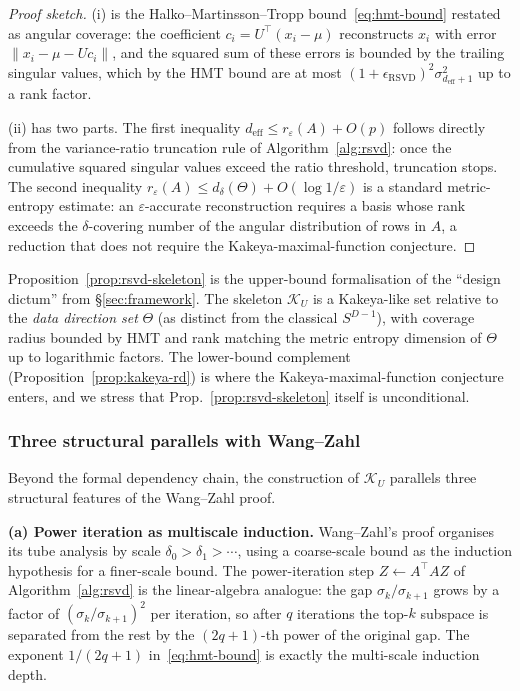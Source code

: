 \documentclass[11pt,a4paper]{article}
\theoremstyle{definition}
\theoremstyle{plain}
\newcommand{\norm}[1]{\left\lVert#1\right\rVert}
\begin{document}
\begin{proof}[Proof sketch]
(i) is the Halko--Martinsson--Tropp bound~\eqref{eq:hmt-bound} restated as angular coverage: the coefficient $c_i = U^\top(x_i - \mu)$ reconstructs $x_i$ with error $\norm{x_i - \mu - U c_i}$, and the squared sum of these errors is bounded by the trailing singular values, which by the HMT bound are at most $(1 + \epsilon_{\text{RSVD}})^2 \sigma_{d_{\text{eff}}+1}^2$ up to a rank factor.

(ii) has two parts. The first inequality $d_{\text{eff}} \leq r_\varepsilon(A) + O(p)$ follows directly from the variance-ratio truncation rule of Algorithm~\ref{alg:rsvd}: once the cumulative squared singular values exceed the ratio threshold, truncation stops. The second inequality $r_\varepsilon(A) \leq d_\delta(\Theta) + O(\log 1/\varepsilon)$ is a standard metric-entropy estimate: an $\varepsilon$-accurate reconstruction requires a basis whose rank exceeds the $\delta$-covering number of the angular distribution of rows in $A$, a reduction that does not require the Kakeya-maximal-function conjecture.
\end{proof}

Proposition~\ref{prop:rsvd-skeleton} is the upper-bound formalisation of the ``design dictum'' from \S\ref{sec:framework}. The skeleton $\mathcal{K}_U$ is a Kakeya-like set relative to the \emph{data direction set} $\Theta$ (as distinct from the classical $S^{D-1}$), with coverage radius bounded by HMT and rank matching the metric entropy dimension of $\Theta$ up to logarithmic factors. The lower-bound complement (Proposition~\ref{prop:kakeya-rd}) is where the Kakeya-maximal-function conjecture enters, and we stress that Prop.~\ref{prop:rsvd-skeleton} itself is unconditional.

\subsubsection*{Three structural parallels with Wang--Zahl}

Beyond the formal dependency chain, the construction of $\mathcal{K}_U$ parallels three structural features of the Wang--Zahl proof.

\textbf{(a) Power iteration as multiscale induction.}
Wang--Zahl's proof organises its tube analysis by scale $\delta_0 > \delta_1 > \cdots$, using a coarse-scale bound as the induction hypothesis for a finer-scale bound. The power-iteration step $Z \leftarrow A^\top A Z$ of Algorithm~\ref{alg:rsvd} is the linear-algebra analogue: the gap $\sigma_k / \sigma_{k+1}$ grows by a factor of $(\sigma_k/\sigma_{k+1})^2$ per iteration, so after $q$ iterations the top-$k$ subspace is separated from the rest by the $(2q+1)$-th power of the original gap. The exponent $1/(2q+1)$ in~\eqref{eq:hmt-bound} is exactly the multi-scale induction depth.
\end{document}
